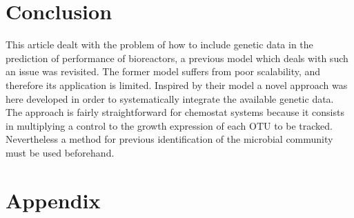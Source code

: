 \documentclass[3p,times]{elsarticle}
\begin{document}
\section{Conclusion}

This article dealt with the problem of how to include genetic data in the prediction of performance of bioreactors, a previous model which deals with such an issue was revisited. The former model suffers from poor scalability, and therefore its application is limited. Inspired by their model a novel approach was here developed in order to systematically integrate the available genetic data. The approach is fairly straightforward for chemostat systems because it consists in multiplying a control to the growth expression of each OTU to be tracked. Nevertheless a method for previous identification of the microbial community must be used beforehand.

\clearpage
\section{Appendix}
\end{document}
